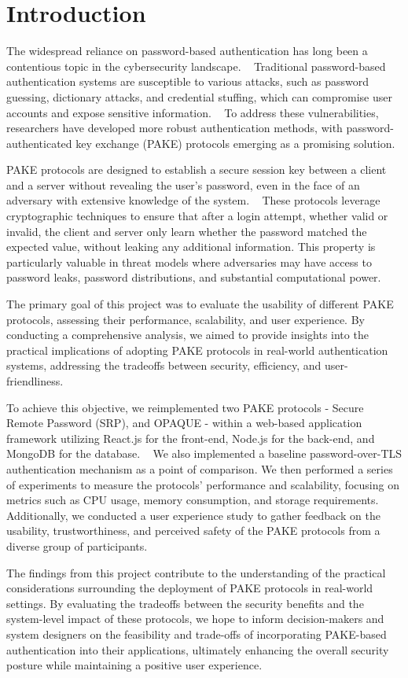 \section{Introduction}
\label{sec:intro}

The widespread reliance on password-based authentication has long been a contentious topic in the cybersecurity landscape. ~\cite{taneski2014password,zviran1999password} Traditional password-based authentication systems are susceptible to various attacks, such as password guessing, dictionary attacks, and credential stuffing, which can compromise user accounts and expose sensitive information. ~\cite{booneau2012guessing, raza2012survey,jia2022analysis} To address these vulnerabilities, researchers have developed more robust authentication methods, with password-authenticated key exchange (PAKE) protocols emerging as a promising solution.

PAKE protocols are designed to establish a secure session key between a client and a server without revealing the user's password, even in the face of an adversary with extensive knowledge of the system. ~\cite{hao2022sokpake} These protocols leverage cryptographic techniques to ensure that after a login attempt, whether valid or invalid, the client and server only learn whether the password matched the expected value, without leaking any additional information. This property is particularly valuable in threat models where adversaries may have access to password leaks, password distributions, and substantial computational power.

The primary goal of this project was to evaluate the usability of different PAKE protocols, assessing their performance, scalability, and user experience. By conducting a comprehensive analysis, we aimed to provide insights into the practical implications of adopting PAKE protocols in real-world authentication systems, addressing the tradeoffs between security, efficiency, and user-friendliness.

To achieve this objective, we reimplemented two PAKE protocols - Secure Remote Password (SRP), and OPAQUE - within a web-based application framework utilizing React.js for the front-end, Node.js for the back-end, and MongoDB for the database. ~\cite{wu1998srp, jarecki2018opaque, SRPrepo, OPAQUErepo} We also implemented a baseline password-over-TLS authentication mechanism as a point of comparison. We then performed a series of experiments to measure the protocols' performance and scalability, focusing on metrics such as CPU usage, memory consumption, and storage requirements. Additionally, we conducted a user experience study to gather feedback on the usability, trustworthiness, and perceived safety of the PAKE protocols from a diverse group of participants.

The findings from this project contribute to the understanding of the practical considerations surrounding the deployment of PAKE protocols in real-world settings. By evaluating the tradeoffs between the security benefits and the system-level impact of these protocols, we hope to inform decision-makers and system designers on the feasibility and trade-offs of incorporating PAKE-based authentication into their applications, ultimately enhancing the overall security posture while maintaining a positive user experience.